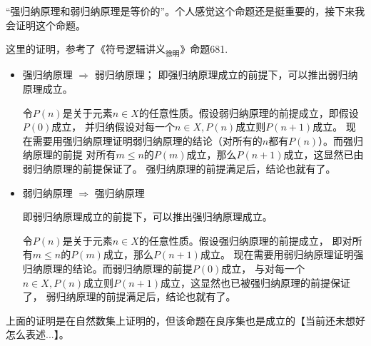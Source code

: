 \documentclass{article}
\begin{document}
\begin{zremark}
  “强归纳原理和弱归纳原理是等价的”。个人感觉这个命题还是挺重要的，接下来我会证明这个命题。

  这里的证明，参考了《符号逻辑讲义$_\text{徐明}$》命题681.
  \begin{itemize}
    \item 强归纳原理 $\Rightarrow$ 弱归纳原理；
          即强归纳原理成立的前提下，可以推出弱归纳原理成立。

          令$P(n)$是关于元素$n \in X$的任意性质。假设弱归纳原理的前提成立，即假设$P(0)$成立，
          并归纳假设对每一个$n \in X, P(n)$成立则$P(n+1)$成立。
          现在需要用强归纳原理证明弱归纳原理的结论（对所有的$n$都有$P(n)$）。而强归纳原理的前提
          对所有$m \leq n$的$P(m)$成立，那么$P(n+1)$成立，这显然已由弱归纳原理的前提保证了。
          强归纳原理的前提满足后，结论也就有了。


    \item 弱归纳原理 $\Rightarrow$ 强归纳原理

          即弱归纳原理成立的前提下，可以推出强归纳原理成立。

          令$P(n)$是关于元素$n \in X$的任意性质。假设强归纳原理的前提成立，
          即对所有$m \leq n$的$P(m)$成立，那么$P(n+1)$成立。
          现在需要用弱归纳原理证明强归纳原理的结论。而弱归纳原理的前提$P(0)$成立，
          与对每一个$n \in X, P(n)$成立则$P(n+1)$成立，这显然也已被强归纳原理的前提保证了，
          弱归纳原理的前提满足后，结论也就有了。
  \end{itemize}
  上面的证明是在自然数集上证明的，但该命题在良序集也是成立的【当前还未想好怎么表述...】。
\end{zremark}
\end{document}
